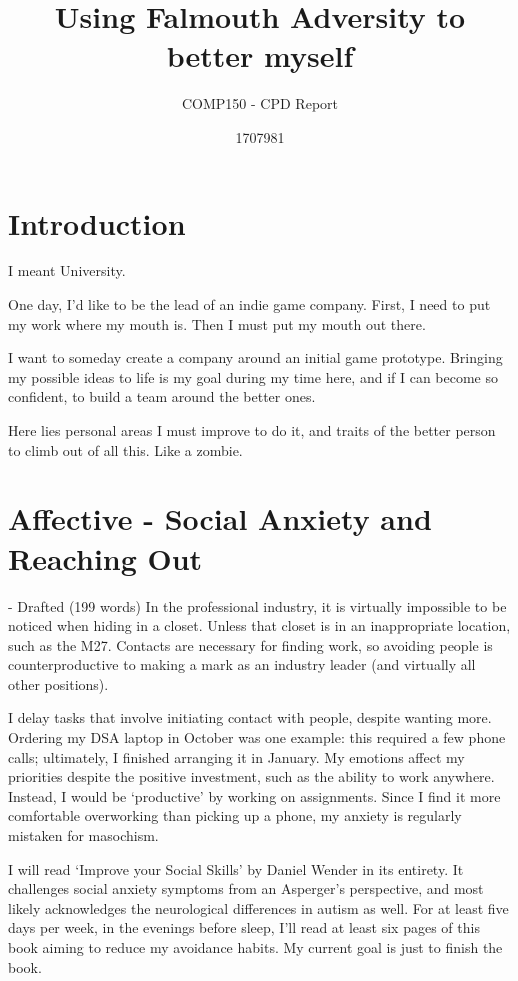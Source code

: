 \documentclass{scrartcl}
\title{Using Falmouth Adversity to better myself}
\subtitle{COMP150 - CPD Report}
\author{1707981}
\begin{document}
\maketitle

\section{Introduction}
I meant University.

One day, I'd like to be the lead of an indie game company. First, I need to put my work where my mouth is. Then I must put my mouth out there.

I want to someday create a company around an initial game prototype. Bringing my possible ideas to life is my goal during my time here, and if I can become so confident, to build a team around the better ones.

Here lies personal areas I must improve to do it, and traits of the better person to climb out of all this. Like a zombie.

\section{Affective - Social Anxiety and Reaching Out} - Drafted (199 words)
In the professional industry, it is virtually impossible to be noticed when hiding in a closet. Unless that closet is in an inappropriate location, such as the M27. Contacts are necessary for finding work, so avoiding people is counterproductive to making a mark as an industry leader (and virtually all other positions).

I delay tasks that involve initiating contact with people, despite wanting more. Ordering my DSA laptop in October was one example: this required a few phone calls; ultimately, I finished arranging it in January. My emotions affect my priorities despite the positive investment, such as the ability to work anywhere. Instead, I would be `productive' by working on assignments. Since I find it more comfortable overworking than picking up a phone, my anxiety is regularly mistaken for masochism.

I will read `Improve your Social Skills' by Daniel Wender in its entirety. It challenges social anxiety symptoms from an Asperger's perspective, and most likely acknowledges the neurological differences in autism as well. For at least five days per week, in the evenings before sleep, I'll read at least six pages of this book aiming to reduce my avoidance habits. My current goal is just to finish the book.
\end{document}
